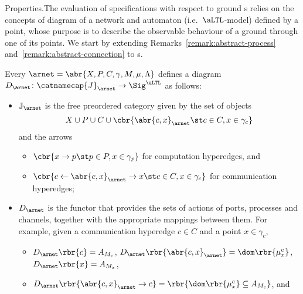 \documentclass{LMCS}
\begin{document}
  \begin{minisection}{Properties.}The evaluation of specifications with respect to ground s relies on the concepts of diagram of a network and automaton (i.e.\ \(\aLTL\)\nb-model) defined by a point, whose purpose is to describe the observable behaviour of a ground  through one of its points.
    We start by extending Remarks~\ref{remark:abstract-process} and~\ref{remark:abstract-connection} to s.

    \begin{fact}
      Every  \(\arnet = \abr{X, P, C, \gamma, M, \mu, \Lambda}\) defines a diagram \(D_{\arnet} \colon \catnamecap{J}_{\arnet} \to \Sig^{\aLTL}\) as follows:
      \begin{itemize}
        
      \item \(\mathbb{J}_{\arnet}\) is the free preordered category given by the set of objects
        \[
        X \cup P \cup C \cup \cbr{\abr{c, x}_{\arnet} \st c \in C, x \in \gamma_{c}}
        \]
        and the arrows
        \begin{itemize}
          
        \item \(\cbr{x \to p \st p \in P, x \in \gamma_{p}}\) for computation hyperedges, and
          
        \item \(\cbr{c \leftarrow \abr{c, x}_{\arnet} \rightarrow x \st c \in C, x \in \gamma_{c}}\) for communication hyperedges;
          
        \end{itemize}
        
      \item \(D_{\arnet}\) is the functor that provides the sets of actions of ports, processes and channels, together with the appropriate mappings between them.
        For example, given a communication hyperedge \(c \in C\) and a point \(x \in \gamma_{c}\),
        \begin{itemize}
          
        \item \(D_{\arnet}\rbr{c} = A_{M_{c}}\), \(D_{\arnet}\rbr{\abr{c, x}_{\arnet}} = \dom\rbr{\mu^{c}_{x}}\), \(D_{\arnet}\rbr{x} = A_{M_{x}}\),
          
        \item \(D_{\arnet}\rbr{\abr{c, x}_{\arnet} \to c} = \rbr{\dom\rbr{\mu^{ c}_{x}} \subseteq A_{M_{c}}}\), and
          

\end{itemize}
\end{itemize}
\end{fact}
\end{minisection}
\end{document}
